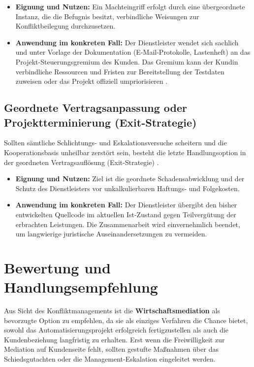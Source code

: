 \begin{itemize}
    \item \textbf{Eignung und Nutzen:} Ein Machteingriff erfolgt durch eine übergeordnete Instanz, die die Befugnis besitzt, verbindliche Weisungen zur Konfliktbeilegung durchzusetzen.
    \item \textbf{Anwendung im konkreten Fall:} Der Dienstleister wendet sich sachlich und unter Vorlage der Dokumentation (E-Mail-Protokolle, Lastenheft) an das Projekt-Steuerungsgremium des Kunden. Das Gremium kann der Kundin verbindliche Ressourcen und Fristen zur Bereitstellung der Testdaten zuweisen oder das Projekt offiziell umpriorisieren \cite[S.~64]{5}.
\end{itemize}

\subsection{Geordnete Vertragsanpassung oder Projektterminierung (Exit-Strategie)}
Sollten sämtliche Schlichtungs- und Eskalationsversuche scheitern und die Kooperationsbasis unheilbar zerstört sein, besteht die letzte Handlungsoption in der geordneten Vertragsauflösung (Exit-Strategie) \cite[S.~62]{5}.

\begin{itemize}
    \item \textbf{Eignung und Nutzen:} Ziel ist die geordnete Schadensabwicklung und der Schutz des Dienstleisters vor unkalkulierbaren Haftungs- und Folgekosten.
    \item \textbf{Anwendung im konkreten Fall:} Der Dienstleister übergibt den bisher entwickelten Quellcode im aktuellen Ist-Zustand gegen Teilvergütung der erbrachten Leistungen. Die Zusammenarbeit wird einvernehmlich beendet, um langwierige juristische Auseinandersetzungen zu vermeiden.
\end{itemize}

\section{Bewertung und Handlungsempfehlung}
Aus Sicht des Konfliktmanagements ist die \textbf{Wirtschaftsmediation} als bevorzugte Option zu empfehlen, da sie als einziges Verfahren die Chance bietet, sowohl das Automatisierungsprojekt erfolgreich fertigzustellen als auch die Kundenbeziehung langfristig zu erhalten. Erst wenn die Freiwilligkeit zur Mediation auf Kundenseite fehlt, sollten gestufte Maßnahmen über das Schiedsgutachten oder die Management-Eskalation eingeleitet werden.

